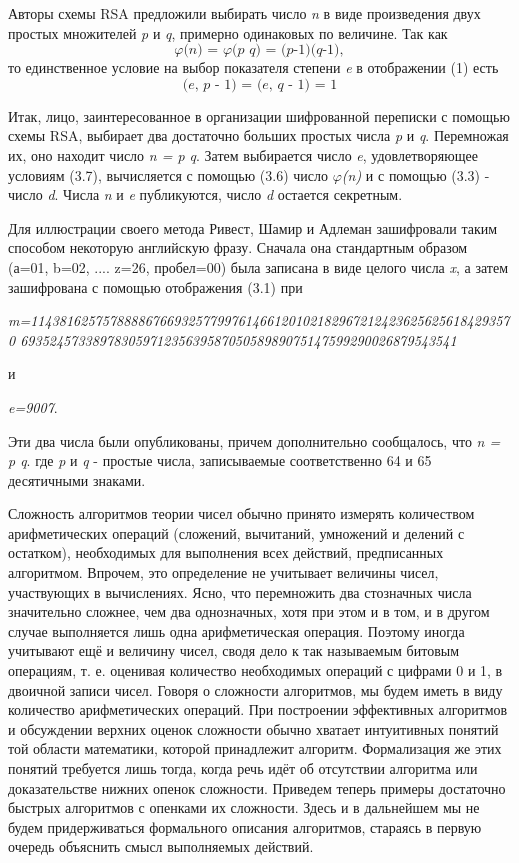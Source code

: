   Авторы схемы RSA предложили выбирать число \textit{n} в виде произведения двух простых множителей \textit{p} и \textit{q}, примерно одинаковых по 
величине. Так как 
\begin{equation}
 \textit{{$\varphi$}(n) = {$\varphi$}(p q) = (p-1)(q-1)},
\end{equation}
то единственное условие на выбор показателя степени \textit{e} в отображении (1) есть
\begin{equation}
 \textit{(e, p - 1) = (e, q - 1) = 1}
\end{equation}

  Итак, лицо, заинтересованное в организации шифрованной переписки с помощью схемы RSA, выбирает два достаточно больших простых числа \textit{p} и \textit{q}. 
Перемножая их, оно находит число \textit{n = p q}. Затем выбирается число \textit{e}, удовлетворяющее условиям (3.7), вычисляется с помощью (3.6) 
число \textit{{$\varphi$}(n)} и с помощью (3.3) - число \textit{d}. Числа \textit{n} и \textit{e} публикуются, число \textit{d} остается секретным. 

  Для иллюстрации своего метода Ривест, Шамир и Адлеман зашифровали таким способом некоторую английскую фразу. Сначала она стандартным образом 
(а=01, b=02, .... z=26, пробел=00) была записана в виде целого числа \textit{x}, а затем зашифрована с помощью отображения (3.1) при
\begin{center}
 \textit{m=11438162575788886766932577997614661201021829672124236256256184293570 6935245733897830597123563958705058989075147599290026879543541}
\end{center}
и 
\begin{center}
 \textit{e=9007}.
\end{center}
Эти два числа были опубликованы, причем дополнительно сообщалось, что \textit{n = p q}. где \textit{p} и \textit{q} - простые числа, записываемые 
соответственно 64 и 65 десятичными знаками. 

  Сложность алгоритмов теории чисел обычно принято измерять количеством арифметических операций (сложений, вычитаний, умножений и делений с остатком), 
необходимых для выполнения всех действий, предписанных алгоритмом. Впрочем, это определение не учитывает величины чисел, участвующих в вычислениях. 
Ясно, что перемножить два стозначных числа значительно сложнее, чем два однозначных, хотя при этом и в том, и в другом случае выполняется лишь одна 
арифметическая операция. Поэтому иногда учитывают ещё и величину чисел, сводя дело к так называемым битовым операциям, т. е. оценивая количество 
необходимых операций с цифрами 0 и 1, в двоичной записи чисел.
Говоря о сложности алгоритмов, мы будем иметь в виду количество арифметических операций. При построении эффективных алгоритмов и обсуждении верхних 
оценок сложности обычно хватает интуитивных понятий той области математики, которой принадлежит алгоритм. Формализация же этих понятий требуется лишь 
тогда, когда речь идёт об отсутствии алгоритма или доказательстве нижних опенок сложности.
Приведем теперь примеры достаточно быстрых алгоритмов с опенками их сложности. Здесь и в дальнейшем мы не будем придерживаться формального описания 
алгоритмов, стараясь в первую очередь объяснить смысл выполняемых действий.

